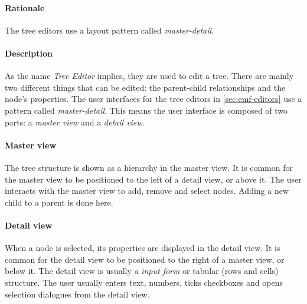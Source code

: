 \paragraph{Rationale}
The tree editors use a layout pattern called \textit{master-detail}.

\paragraph{Description}
As the name \textit{Tree Editor} implies, they are used to edit a tree.
There are mainly two different things that can be edited: the parent-child relationships and the node's properties.
The user interfaces for the tree editors in \cref{sec:emf-editors} use a pattern called \textit{master-detail}.
This means the user interface is composed of two parts: a \textit{master view} and a \textit{detail view}.


\paragraph{Master view}
The tree structure is shown as a hierarchy in the master view.
It is common for the master view to be positioned to the left of a detail view, or above it.
The user interacts with the master view to add, remove and select nodes.
Adding a new child to a parent is done here.


\paragraph{Detail view}
When a node is selected, its properties are displayed in the detail view.
It is common for the detail view to be positioned to the right of a master view, or below it.
The detail view is usually a \textit{input form} or tabular (rows and cells) structure.
The user usually enters text, numbers, ticks checkboxes and opens selection dialogues from the detail view.